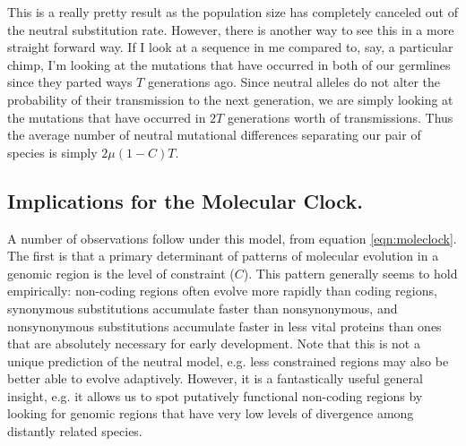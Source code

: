This is a really pretty result as the population size has completely canceled
out of the neutral substitution rate. However, there is another way to see this
in a more straight forward way. If I look at a sequence in me compared to, say, a
particular chimp, I'm looking at the mutations that have occurred in both of
our germlines since they parted ways $T$ generations ago. Since neutral alleles
do not alter the probability of their transmission to the next generation, we
are simply looking at the mutations that have occurred in $2T$ generations
worth of transmissions. Thus the average number of neutral mutational
differences separating our pair of species is simply $2\mu (1-C) T$.\\

\subsection{Implications for the Molecular Clock.}
A number of observations follow under this model, from equation \eqref{eqn:moleclock}. The first is that a primary determinant of patterns of molecular evolution in a genomic region is the level of constraint ($C$). This pattern generally seems to hold empirically: non-coding regions often evolve more rapidly than coding regions, synonymous substitutions accumulate faster than nonsynonymous, and nonsynonymous substitutions accumulate faster in less vital proteins than ones that are absolutely necessary for early development. Note that this is not a unique prediction of the neutral model, e.g. less constrained regions may also be better able to evolve adaptively. However, it is a fantastically useful general insight, e.g. it allows us to spot putatively functional non-coding regions by looking for genomic regions that have very low levels of divergence among distantly related species.
